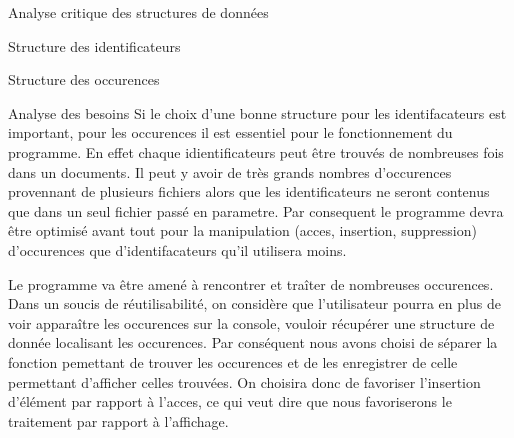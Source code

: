 \documentclass{article}
\begin{document}
\begin{section}{Analyse critique des structures de données}


  \begin{subsection}{Structure des identificateurs}

  \end{subsection}

  \begin{subsection}{Structure des occurences}
\begin{paragraph}{Analyse des besoins}
Si le choix d'une bonne structure pour les identifacateurs est important, pour les occurences il est essentiel pour le 
fonctionnement du programme. En effet chaque idientificateurs peut être trouvés de nombreuses fois dans un documents. Il peut 
y avoir de très grands nombres d'occurences provennant de plusieurs fichiers alors que les identificateurs ne seront contenus
que dans un seul fichier passé en parametre. Par consequent le programme devra être optimisé avant tout pour la manipulation
(acces, insertion, suppression) d'occurences que d'identifacateurs qu'il utilisera moins.
\end{paragraph}

\begin{paragraph}
 Le programme va être amené à rencontrer et traîter de nombreuses occurences. Dans un soucis de réutilisabilité, on considère
que l'utilisateur pourra en plus de voir apparaître les occurences sur la console, vouloir récupérer une structure de donnée
localisant les occurences. Par conséquent nous avons choisi de séparer la fonction pemettant de trouver les occurences et de
les enregistrer de celle permettant d'afficher celles trouvées. On choisira donc de favoriser l'insertion d'élément par
rapport à l'acces, ce qui veut dire que nous favoriserons le traitement par rapport à l'affichage.

\end{paragraph}


  \end{subsection}

\end{section}
\end{document}
